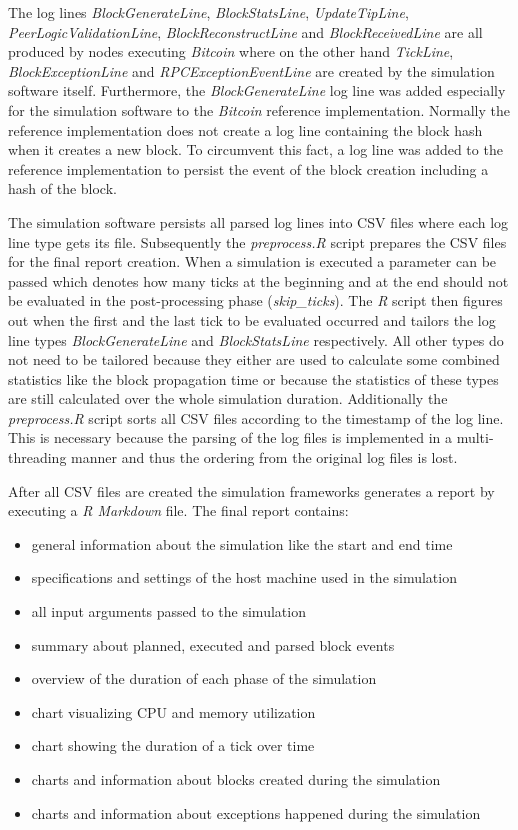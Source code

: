 The log lines \textit{BlockGenerateLine}, \textit{BlockStatsLine}, \textit{UpdateTipLine}, \textit{PeerLogicValidationLine}, \textit{BlockReconstructLine} and \textit{BlockReceivedLine} are all produced by nodes executing \textit{Bitcoin} where on the other hand \textit{TickLine}, \textit{BlockExceptionLine} and \textit{RPCExceptionEventLine} are created by the simulation software itself.
Furthermore, the \textit{BlockGenerateLine} log line was added especially for the simulation software to the \textit{Bitcoin} reference implementation.
Normally the reference implementation does not create a log line containing the block hash when it creates a new block.
To circumvent this fact, a log line was added to the reference implementation to persist the event of the block creation including a hash of the block.

The simulation software persists all parsed log lines into CSV files where each log line type gets its file.
Subsequently the \textit{preprocess.R} script prepares the CSV files for the final report creation.
When a simulation is executed a parameter can be passed which denotes how many ticks at the beginning and at the end should not be evaluated in the post-processing phase (\textit{skip\_ticks}).
The \textit{R} script then figures out when the first and the last tick to be evaluated occurred and tailors the log line types \textit{BlockGenerateLine} and \textit{BlockStatsLine} respectively.
All other types do not need to be tailored because they either are used to calculate some combined statistics like the block propagation time or because the statistics of these types are still calculated over the whole simulation duration.
Additionally the \textit{preprocess.R} script sorts all CSV files according to the timestamp of the log line.
This is necessary because the parsing of the log files is implemented in a multi-threading manner and thus the ordering from the original log files is lost.

After all CSV files are created the simulation frameworks generates a report by executing a \textit{R Markdown} file.
The final report contains:
\begin{itemize}
	\item general information about the simulation like the start and end time
	\item specifications and settings of the host machine used in the simulation
	\item all input arguments passed to the simulation
	\item summary about planned, executed and parsed block events
	\item overview of the duration of each phase of the simulation
	\item chart visualizing CPU and memory utilization
	\item chart showing the duration of a tick over time
	\item charts and information about blocks created during the simulation
	\item charts and information about exceptions happened during the simulation
\end{itemize}

